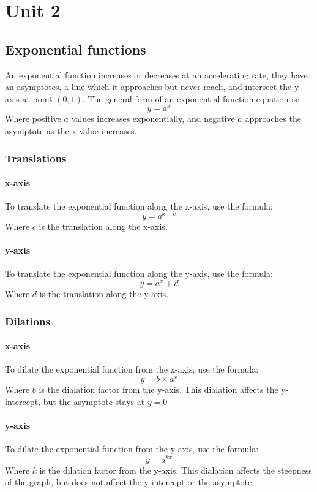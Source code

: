 \documentclass{report}
\begin{document}
\chapter{Unit 2}
\section{Exponential functions}
An exponential function increases or decreases at an accelerating rate, they have an asymptotes, a line which it approaches but never reach, and intersect the y-axis at point $(0, 1)$.  The general form of an exponential function equation is:
$$
	y = a^x
$$
Where positive $a$ values increases exponentially, and negative $a$ approaches the asymptote as the x-value increases.

\subsection{Translations}
\subsubsection{x-axis}
To translate the exponential function along the x-axis, use the formula:
$$
	y = a^{x - c}
$$
Where $c$ is the translation along the x-axis.\\

\subsubsection{y-axis}
To translate the exponential function along the y-axis, use the formula:
$$
	y = a^x + d
$$
Where $d$ is the translation along the y-axis.

\subsection{Dilations}
\subsubsection{x-axis}
To dilate the exponential function from the x-axis, use the formula:
$$
	y = b \times a^x
$$
Where $b$ is the dialation factor from the y-axis.  This dialation affects the y-intercept, but the asymptote stays at $y = 0$\\

\subsubsection{y-axis}
To dilate the exponential function from the y-axis, use the formula:
$$
	y = a^{kx}
$$
Where $k$ is the dilation factor from the y-axis.  This dialation affects the steepness of the graph, but does not affect the y-intercept or the asymptote.
\end{document}
